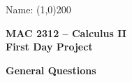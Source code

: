 \documentclass[12 pt]{article}
\begin{document}
\begin{flushright}Name: \line(1,0){200}\end{flushright}
\vspace{1mm}
\begin{center}
\large{\textbf{MAC 2312 -- Calculus II \\ First Day Project}}
\end{center}
\hspace{-0.5in}\textbf{General Questions}
\end{document}
